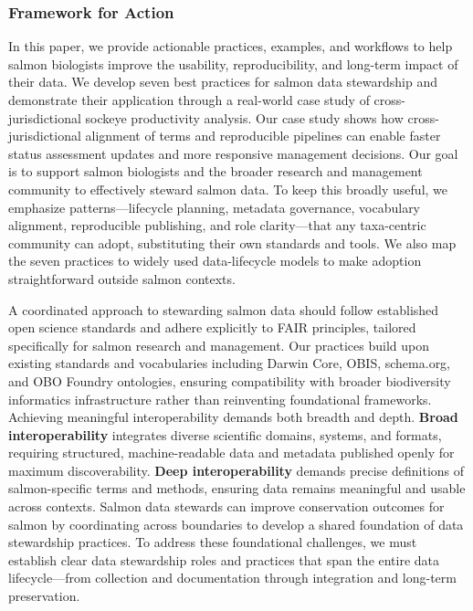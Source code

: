 \documentclass[
  letterpaper,
  DIV=11,
  numbers=noendperiod]{scrartcl}
\begin{document}
\subsubsection{Framework for Action}\label{framework-for-action}

In this paper, we provide actionable practices, examples, and workflows
to help salmon biologists improve the usability, reproducibility, and
long-term impact of their data. We develop seven best practices for
salmon data stewardship and demonstrate their application through a
real-world case study of cross-jurisdictional sockeye productivity
analysis. Our case study shows how cross-jurisdictional alignment of
terms and reproducible pipelines can enable faster status assessment
updates and more responsive management decisions. Our goal is to support
salmon biologists and the broader research and management community to
effectively steward salmon data. To keep this broadly useful, we
emphasize patterns---lifecycle planning, metadata governance, vocabulary
alignment, reproducible publishing, and role clarity---that any
taxa-centric community can adopt, substituting their own standards and
tools. We also map the seven practices to widely used data-lifecycle
models to make adoption straightforward outside salmon contexts.

A coordinated approach to stewarding salmon data should follow
established open science standards and adhere explicitly to FAIR
principles, tailored specifically for salmon research and management.
Our practices build upon existing standards and vocabularies including
Darwin Core, OBIS, schema.org, and OBO Foundry ontologies, ensuring
compatibility with broader biodiversity informatics infrastructure
rather than reinventing foundational frameworks. Achieving meaningful
interoperability demands both breadth and depth. \textbf{Broad
interoperability} integrates diverse scientific domains, systems, and
formats, requiring structured, machine-readable data and metadata
published openly for maximum discoverability. \textbf{Deep
interoperability} demands precise definitions of salmon-specific terms
and methods, ensuring data remains meaningful and usable across
contexts. Salmon data stewards can improve conservation outcomes for
salmon by coordinating across boundaries to develop a shared foundation
of data stewardship practices. To address these foundational challenges,
we must establish clear data stewardship roles and practices that span
the entire data lifecycle---from collection and documentation through
integration and long-term preservation.
\end{document}

